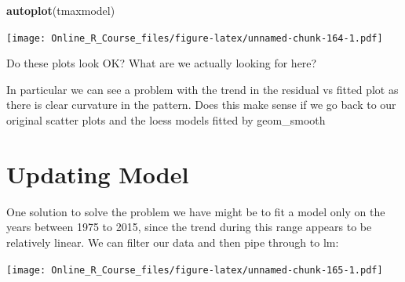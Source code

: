 \documentclass[]{book}
\newenvironment{Shaded}{\begin{snugshade}}{\end{snugshade}}
\newcommand{\DataTypeTok}[1]{\textcolor[rgb]{0.13,0.29,0.53}{#1}}
\newcommand{\DecValTok}[1]{\textcolor[rgb]{0.00,0.00,0.81}{#1}}
\newcommand{\KeywordTok}[1]{\textcolor[rgb]{0.13,0.29,0.53}{\textbf{#1}}}
\newcommand{\NormalTok}[1]{#1}
\newcommand{\OperatorTok}[1]{\textcolor[rgb]{0.81,0.36,0.00}{\textbf{#1}}}
\newcommand{\StringTok}[1]{\textcolor[rgb]{0.31,0.60,0.02}{#1}}
\begin{document}
\begin{Shaded}
\begin{Highlighting}[]
\KeywordTok{autoplot}\NormalTok{(tmaxmodel)}
\end{Highlighting}
\end{Shaded}

\texttt{[image: Online\_R\_Course\_files/figure-latex/unnamed-chunk-164-1.pdf]}

Do these plots look OK? What are we actually looking for here?

In particular we can see a problem with the trend in the residual vs fitted plot as there is clear curvature in the pattern. Does this make sense if we go back to our original scatter plots and the loess models fitted by geom\_smooth

\hypertarget{updating-model}{%
\section{Updating Model}\label{updating-model}}

One solution to solve the problem we have might be to fit a model only on the years between 1975 to 2015, since the trend during this range appears to be relatively linear. We can filter our data and then pipe through to lm:

\begin{Shaded}
\end{Shaded}

\texttt{[image: Online\_R\_Course\_files/figure-latex/unnamed-chunk-165-1.pdf]}

\begin{Shaded}
\end{Shaded}
\end{document}
